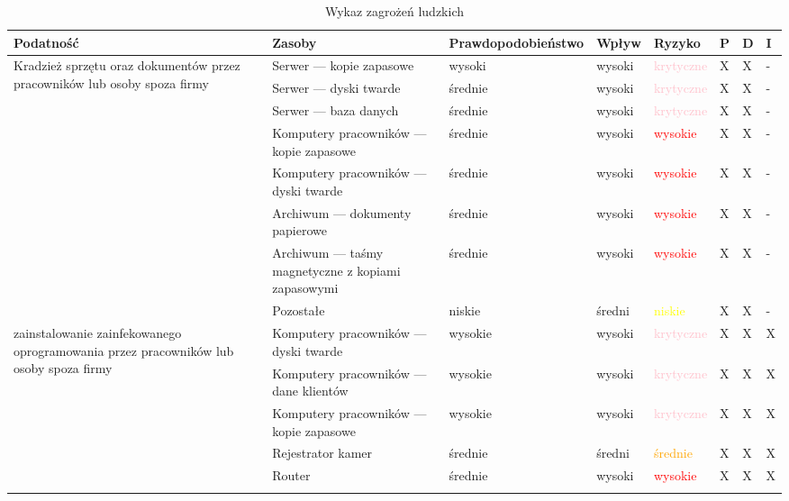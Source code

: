 \begin{landscape}
	\begin{longtable}[ht!]{|m{4cm}|m{6cm}|m{4.5cm}|m{2.5cm}|m{2.5cm}|m{0.5cm}|m{0.5cm}|m{0.5cm}|}
		\caption{Wykaz zagrożeń ludzkich}
		\label{tab::zagrozenia_ludzkie2} \\
		\hline
		\textbf{Podatność} & \textbf{Zasoby} & \textbf{Prawdopodobieństwo} & \textbf{Wpływ} &  \textbf{Ryzyko} & \textbf{P} & \textbf{D} & \textbf{I} \\ \hline
		\multirow{8}{4cm}{Kradzież sprzętu oraz dokumentów przez pracowników lub osoby spoza firmy}            
		& Serwer --- kopie zapasowe & wysoki & wysoki & \textcolor{pink}{krytyczne} & X & X & -  \\ \cline{2-8}
		& Serwer --- dyski twarde & średnie & wysoki & \textcolor{pink}{krytyczne} & X & X & -  \\ \cline{2-8} 
		& Serwer --- baza danych & średnie & wysoki & \textcolor{pink}{krytyczne} & X & X & -  \\ \cline{2-8} 
		& Komputery pracowników --- kopie zapasowe & średnie & wysoki & \textcolor{red}{wysokie} & X & X & -  \\ \cline{2-8}
		& Komputery pracowników --- dyski twarde & średnie & wysoki & \textcolor{red}{wysokie} & X & X & -  \\ \cline{2-8}
		& Archiwum --- dokumenty papierowe & średnie & wysoki & \textcolor{red}{wysokie} & X & X & -  \\ \cline{2-8}
		& Archiwum --- taśmy magnetyczne z kopiami zapasowymi  & średnie  & wysoki & \textcolor{red}{wysokie} & X & X & -  \\ \cline{2-8}
		& Pozostałe & niskie  & średni & \textcolor{yellow}{niskie} & X & X & -  \\ \hline
		\multirow{7}{4cm}{zainstalowanie zainfekowanego oprogramowania przez pracowników lub osoby spoza firmy} 
		& Komputery pracowników --- dyski twarde & wysokie & wysoki & \textcolor{pink}{krytyczne} & X & X & X  \\ \cline{2-8}
		& Komputery pracowników --- dane klientów & wysokie & wysoki & \textcolor{pink}{krytyczne} & X & X & X  \\ \cline{2-8}
		& Komputery pracowników --- kopie zapasowe & wysokie & wysoki & \textcolor{pink}{krytyczne} & X & X & X  \\ \cline{2-8}
		& Rejestrator kamer & średnie & średni & \textcolor{orange}{średnie} & X & X & X  \\ \cline{2-8}
		& Router & średnie & wysoki & \textcolor{red}{wysokie} & X & X & X  \\ \cline{2-8}

\end{longtable}
\end{landscape}
